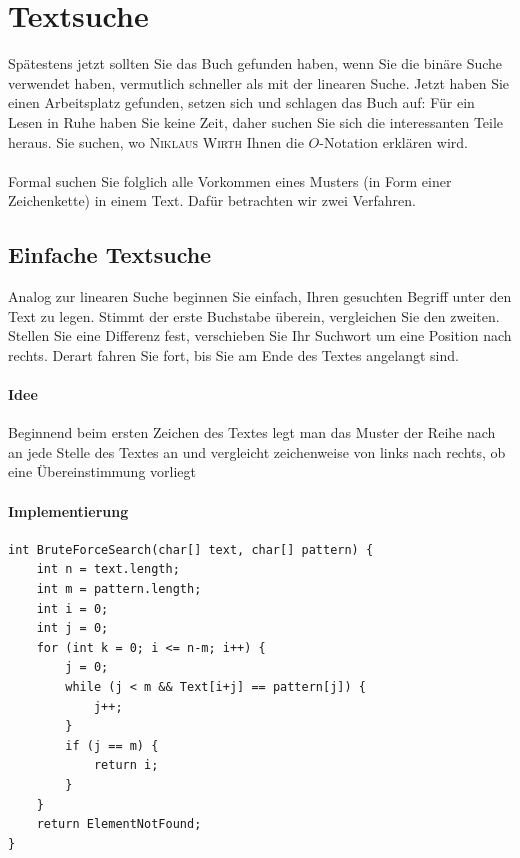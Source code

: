 \documentclass[11pt,a4paper]{scrartcl}
\begin{document}
\section{Textsuche}
Spätestens jetzt sollten Sie das Buch gefunden haben, wenn Sie die binäre Suche verwendet haben, vermutlich schneller als mit der linearen Suche. Jetzt haben Sie einen Arbeitsplatz gefunden, setzen sich und schlagen das Buch auf: Für ein Lesen in Ruhe haben Sie keine Zeit, daher suchen Sie sich die interessanten Teile heraus. Sie suchen, wo \textsc{Niklaus Wirth} Ihnen die $O$-Notation erklären wird. \\\\
Formal suchen Sie folglich alle Vorkommen eines Musters (in Form einer Zeichenkette) in einem Text. Dafür betrachten wir zwei Verfahren.
\subsection{Einfache Textsuche}
Analog zur linearen Suche beginnen Sie einfach, Ihren gesuchten Begriff unter den Text zu legen. Stimmt der erste Buchstabe überein, vergleichen Sie den zweiten. Stellen Sie eine Differenz fest, verschieben Sie Ihr Suchwort um eine Position nach rechts. Derart fahren Sie fort, bis Sie am Ende des Textes angelangt sind.
\paragraph{Idee}
Beginnend beim ersten Zeichen des Textes legt man das Muster der Reihe nach an jede Stelle des Textes an und vergleicht zeichenweise von links nach rechts, ob eine Übereinstimmung vorliegt
\paragraph{Implementierung}
\begin{lstlisting}
int BruteForceSearch(char[] text, char[] pattern) {
	int n = text.length;
	int m = pattern.length;
	int i = 0;
	int j = 0;
	for (int k = 0; i <= n-m; i++) {
		j = 0;
		while (j < m && Text[i+j] == pattern[j]) {		
			j++;		
		}
		if (j == m) {
			return i;		
		}
	}
	return ElementNotFound;
}
\end{lstlisting}
\end{document}
